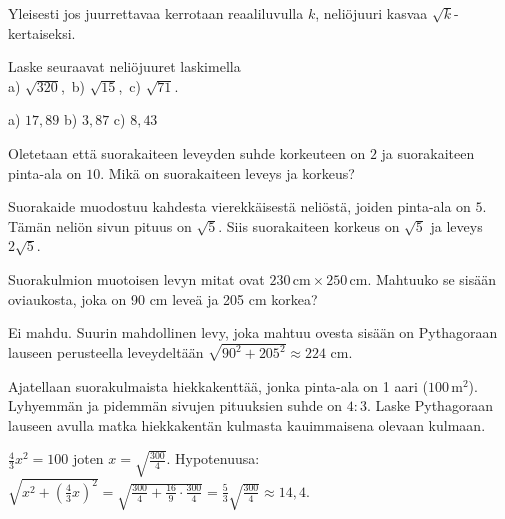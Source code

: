 \begin{tehtavasivu}
\begin{tehtava}
\begin{vastaus}
        Yleisesti jos juurrettavaa kerrotaan reaaliluvulla $k$, neliöjuuri kasvaa $\sqrt{k}$-kertaiseksi.
        \end{vastaus}
\end{tehtava}

\begin{tehtava}
Laske seuraavat neliöjuuret laskimella\\
a) $\sqrt{320}$,\ b) $\sqrt{15}$,\ c) $\sqrt{71}$.
\begin{vastaus}
a) $17,89$ b) $3,87$ c) $8,43$
\end{vastaus}
\end{tehtava}


\begin{tehtava}
Oletetaan että suorakaiteen leveyden suhde korkeuteen on $2$ ja suorakaiteen pinta-ala on $10$. Mikä on suorakaiteen 
leveys ja korkeus?
\begin{vastaus}
Suorakaide muodostuu kahdesta vierekkäisestä neliöstä, joiden pinta-ala on $5$. Tämän neliön sivun pituus on $\sqrt{5}$. Siis suorakaiteen korkeus on $\sqrt{5}$ ja leveys $2\sqrt{5}$.
\end{vastaus}
\end{tehtava}

\begin{tehtava}
Suorakulmion muotoisen levyn mitat ovat $230\,\text{cm}\times 250\,\text{cm}$. Mahtuuko se sisään oviaukosta, joka on 90 cm leveä ja 205 cm korkea?
       
        \begin{vastaus}
        Ei mahdu. Suurin mahdollinen levy, joka mahtuu ovesta sisään on Pythagoraan lauseen perusteella leveydeltään $\sqrt{90^2+205^2}\approx 224$ cm.
        \end{vastaus}
\end{tehtava}


\begin{tehtava}
Ajatellaan suorakulmaista hiekkakenttää, jonka pinta-ala on 1 aari ($100\,\mathrm{m}^2$). Lyhyemmän ja pidemmän sivujen 
pituuksien suhde on $4:3$. Laske Pythagoraan lauseen avulla matka hiekkakentän kulmasta kauimmaisena olevaan kulmaan.
\begin{vastaus}
$\frac{4}{3}x^2=100$ joten $x = \sqrt{\frac{300}{4}}$. 
Hypotenuusa: $\sqrt{x^2 + (\frac{4}{3}x)^2}=\sqrt{\frac{300}{4}+\frac{16}{9}\cdot \frac{300}{4}}
=\frac{5}{3}\sqrt{\frac{300}{4}}\approx 14{,}4$.
\end{vastaus}
\end{tehtava}


\end{tehtavasivu}
